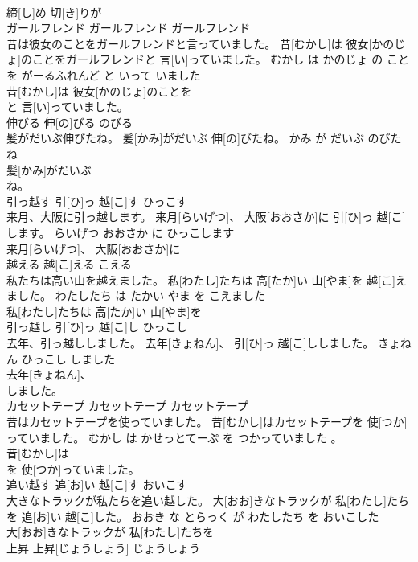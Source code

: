 \documentclass[8pt]{extreport}
\begin{document}
\begin{CJK}{UTF8}{min}
\\	締[し]め 切[き]りが
\\	ガールフレンド	ガールフレンド	ガールフレンド	
\\	昔は彼女のことをガールフレンドと言っていました。	昔[むかし]は 彼女[かのじょ]のことをガールフレンドと 言[い]っていました。	むかし は かのじょ の こと を がーるふれんど と いって いました	
\\	昔[むかし]は 彼女[かのじょ]のことを
\\	と 言[い]っていました。		
\\	伸びる	伸[の]びる	のびる	
\\	髪がだいぶ伸びたね。	髪[かみ]がだいぶ 伸[の]びたね。	かみ が だいぶ のびた ね	
\\	髪[かみ]がだいぶ
\\	ね。		
\\	引っ越す	引[ひ]っ 越[こ]す	ひっこす	
\\	来月、大阪に引っ越します。	来月[らいげつ]、 大阪[おおさか]に 引[ひ]っ 越[こ]します。	らいげつ おおさか に ひっこします	
\\	来月[らいげつ]、 大阪[おおさか]に
\\	越える	越[こ]える	こえる	
\\	私たちは高い山を越えました。	私[わたし]たちは 高[たか]い 山[やま]を 越[こ]えました。	わたしたち は たかい やま を こえました	
\\	私[わたし]たちは 高[たか]い 山[やま]を
\\	引っ越し	引[ひ]っ 越[こ]し	ひっこし	
\\	去年、引っ越ししました。	去年[きょねん]、 引[ひ]っ 越[こ]ししました。	きょねん ひっこし しました	
\\	去年[きょねん]、
\\	しました。		
\\	カセットテープ	カセットテープ	カセットテープ	
\\	昔はカセットテープを使っていました。	昔[むかし]はカセットテープを 使[つか]っていました。	むかし は かせっとてーぷ を つかっていました 。	
\\	昔[むかし]は
\\	を 使[つか]っていました。		
\\	追い越す	追[お]い 越[こ]す	おいこす	
\\	大きなトラックが私たちを追い越した。	大[おお]きなトラックが 私[わたし]たちを 追[お]い 越[こ]した。	おおき な とらっく が わたしたち を おいこした	
\\	大[おお]きなトラックが 私[わたし]たちを
\\	上昇	上昇[じょうしょう]	じょうしょう	

\end{CJK}
\end{document}
